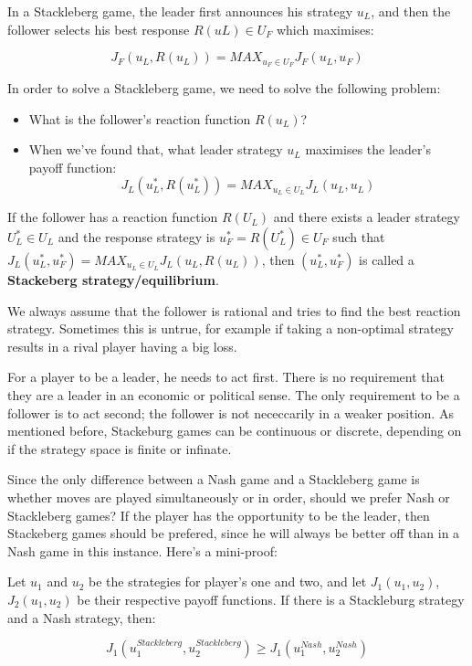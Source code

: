 
In a Stackleberg game, the leader first announces his strategy $u_L$, and then
the follower selects his best response $R(uL) \in U_F$ which maximises:

\[
  J_F(u_L, R(u_L)) = MAX_{u_F \in U_F} J_F(u_L, u_F)
\]

In order to solve a Stackleberg game, we need to solve the following problem:

\begin{itemize}
  \item What is the follower's reaction function $R(u_L)$?
  \item When we've found that, what leader strategy $u_L$ maximises the leader's
  payoff function:
  \[
    J_L(u^*_L, R(u^*_L)) = MAX_{u_L \in U_L} J_L(u_L, u_L)
  \]
\end{itemize}

If the follower has a reaction function $R(U_L)$ and there exists a leader
strategy $U^*_L \in U_L$ and the response strategy is $u^*_F = R(U^*_L) \in U_F$
such that $J_L(u^*_L, u^*_F) = MAX_{u_L \in U_L} J_L(u_L, R(u_L))$, then
$(u^*_L, u^*_F)$ is called a \textbf{Stackeberg strategy/equilibrium}.

We always assume that the follower is rational and tries to find the best
reaction strategy. Sometimes this is untrue, for example if taking a non-optimal
strategy results in a rival player having a big loss.

For a player to be a leader, he needs to act first. There is no requirement that
they are a leader in an economic or political sense. The only requirement to be
a follower is to act second; the follower is not nececcarily in a weaker
position. As mentioned before, Stackeburg games can be continuous or discrete,
depending on if the strategy space is finite or infinate.

Since the only difference between a Nash game and a Stackleberg game is whether
moves are played simultaneously or in order, should we prefer Nash or
Stackleberg games? If the player has the opportunity to be the leader, then
Stackeberg games should be prefered, since he will always be better off than in
a Nash game in this instance. Here's a mini-proof:

Let $u_1$ and $u_2$ be the strategies for player's one and two, and let
$J_1(u_1, u_2)$, $J_2(u_1, u_2)$ be their respective payoff functions. If there
is a Stackleburg strategy and a Nash strategy, then:

\[
  J_1(u^{Stackleberg}_1, u^{Stackleberg}_2) \geq J_1(u^{Nash}_1, u^{Nash}_2)
\]

